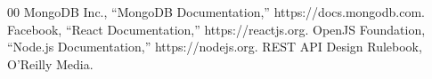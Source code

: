 \documentclass[conference]{IEEEtran}
\begin{document}
\begin{thebibliography}{00}
 MongoDB Inc., ``MongoDB Documentation,'' https://docs.mongodb.com.
 Facebook, ``React Documentation,'' https://reactjs.org.
 OpenJS Foundation, ``Node.js Documentation,'' https://nodejs.org.
 REST API Design Rulebook, O'Reilly Media.
\end{thebibliography}
\end{document}
